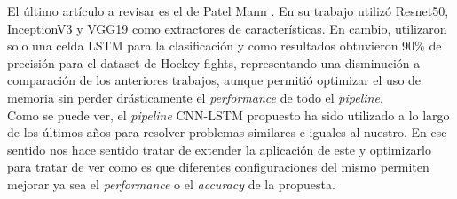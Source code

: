 El último artículo a revisar es el de Patel Mann 
 \cite{Mann2021}. En su trabajo utilizó Resnet50, InceptionV3 
y VGG19 como extractores de características. En cambio, 
utilizaron solo una celda LSTM para la clasificación y como 
resultados obtuvieron 90\% de precisión para 
el dataset de Hockey fights, representando una disminución a 
comparación de los anteriores trabajos, aunque permitió optimizar 
el uso de memoria sin perder drásticamente el \textit{performance} 
de todo el \textit{pipeline}.\\

Como se puede ver, el \textit{pipeline} CNN-LSTM propuesto ha 
sido utilizado a lo largo de los últimos años para resolver 
problemas similares e iguales al nuestro. En ese sentido nos hace 
sentido tratar de extender la aplicación de este y optimizarlo 
para tratar de ver como es que diferentes configuraciones del 
mismo permiten mejorar ya sea el \textit{performance} o el 
\textit{accuracy} de la propuesta.
